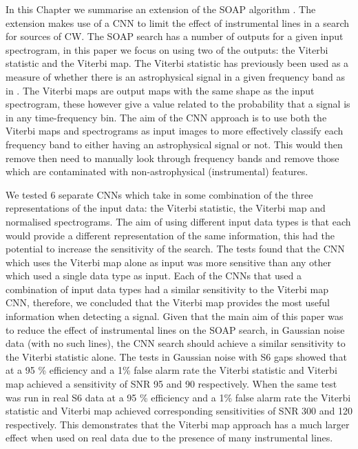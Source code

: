 %
In this Chapter we summarise an extension of the SOAP algorithm \citep{bayley2019SOAPGeneralised}.
The extension makes use of a \gls{CNN} to limit the effect of
instrumental lines in a search for sources of \gls{CW}. 
The SOAP search has a number of outputs for a given input
spectrogram, in this paper we focus on using two of the outputs: the Viterbi statistic and the Viterbi map.
The Viterbi statistic has previously been used as a
measure of whether there is an astrophysical signal in a given frequency band as in \citep{bayley2019SOAPGeneralised}.
The Viterbi maps are output maps with the same shape as the input
spectrogram, these however give a value related to the probability that a signal is in any time-frequency bin. 
The aim of the \gls{CNN} approach is to use
both the Viterbi maps and spectrograms as input images to more effectively classify each
frequency band to either having an astrophysical signal or
not. This would then remove then need to manually look through frequency bands
and remove those which are contaminated with non-astrophysical (instrumental)
features. 

%
We tested 6 separate \glspl{CNN} which take in some combination of the three representations of the input data: the Viterbi statistic, the Viterbi map and normalised spectrograms. 
The aim of using different input data types is that each would
provide a different representation of the same information, this had
the potential to increase the sensitivity of the search. The tests found
that the \gls{CNN} which uses the Viterbi map alone as input was more sensitive
than any other which used a single data type as input. Each of the \glspl{CNN}
that used a combination of input data types had a similar sensitivity to the
Viterbi map \gls{CNN}, therefore, we concluded that the Viterbi map provides the most
useful information when detecting a signal.  Given that the main aim of this
paper was to reduce the effect of instrumental lines on the SOAP search, in
Gaussian noise data (with no such lines), the \gls{CNN} search should achieve a
similar sensitivity to the Viterbi statistic alone. The tests in Gaussian noise
with S6 gaps showed that at a 95 \% efficiency and a 1\% false alarm rate the
Viterbi statistic and Viterbi map achieved a sensitivity of SNR 95 and 90
respectively. When the same test was run in real S6 data at a 95 \% efficiency
and a 1\% false alarm rate the Viterbi statistic and Viterbi map achieved
corresponding sensitivities of SNR 300 and 120 respectively. This demonstrates
that the Viterbi map approach has a much larger effect when used on real data
due to the presence of many instrumental lines. 

